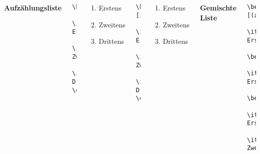 \begin{frame}[fragile]
	\begin{columns}
		
		\textbf{Aufzählungsliste}
		\begin{lstlisting}
\begin{enumerate}
	\item Erstens
	\item Zweitens
	\item Drittens 
\end{enumerate}
\end{lstlisting}
\begin{outputbox}
	\begin{enumerate}
		\item Erstens
		\item Zweitens
		\item Drittens 
	\end{enumerate}
\end{outputbox}
		\begin{lstlisting}
\begin{enumerate}[I]
	\item Erstens
	\item Zweitens
	\item Drittens 
\end{enumerate}
\end{lstlisting}
\begin{outputbox}
	\begin{enumerate}[I]
		\item Erstens
		\item Zweitens
		\item Drittens 
	\end{enumerate}
\end{outputbox}			
\textbf{Gemischte Liste}
		\begin{lstlisting}
\begin{enumerate}[(a)]
	\item Erstens
	\begin{itemize}
		\item Erstens
			\begin{eqlist}
				\item[Erstens] Erstens
				\item[Zweitens] Zweitens

\end{lstlisting}
\end{columns}
\end{frame}
